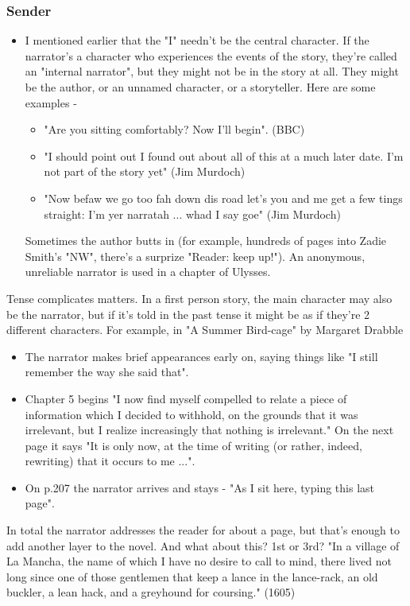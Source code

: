 \documentclass[11pt]{article}
\begin{document}
\subsubsection*{Sender}
\begin{itemize}
\item I mentioned earlier that the "I" needn't be the central character. If the narrator's a character who experiences the events of the story, they're called an "internal narrator", but they might not be in the story at all. They might be the author, or an unnamed character, or a storyteller. Here are some examples -
\begin{itemize}
\item  "Are you sitting comfortably? Now I'll begin".  (BBC)
\item "I should point out I found out about all of this at a much later date. I'm not part of the story yet" (Jim Murdoch)
\item "Now befaw we go too fah down dis road let's you and me get a few tings straight: I'm yer narratah ... whad I say goe" (Jim Murdoch)
\end{itemize}

Sometimes the author butts in (for example, hundreds of pages into Zadie Smith's "NW", there's a surprize "Reader: keep up!"). An anonymous, unreliable narrator is used in a chapter of Ulysses.

\end{itemize}
Tense complicates matters. In a first person story, the main character may also be the narrator, but if it's told in the past tense it might be as if they're 2 different characters. For example, in "A Summer Bird-cage" by Margaret Drabble

 \begin{itemize}
\item The narrator makes brief appearances early on, saying things like "I still remember the way she said that". 
\item Chapter 5 begins "I now find myself compelled to relate a piece of information which I decided to withhold, on the grounds that it was irrelevant, but I realize increasingly that nothing is irrelevant." On the next page it says "It is only now, at the time of writing (or rather, indeed, rewriting) that it occurs to me ...".
\item On p.207 the narrator arrives and stays - "As I sit here, typing this last page". 
\end{itemize}
In total the narrator addresses the reader for about a page, but that's enough to add another layer to the novel. And what about this? 1st or 3rd? "In a village of La Mancha, the name of which I have no desire to call to mind, there lived not long since one of those gentlemen that keep a lance in the lance-rack, an old buckler, a lean hack, and a greyhound for coursing." (1605)
\end{document}
